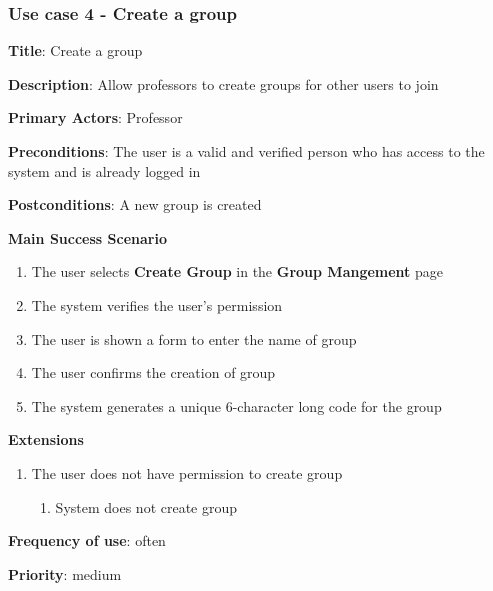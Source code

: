 \documentclass[singlespacing,12pt,parskip,headsepline,consistentlayout]{article}
\begin{document}
\subsubsection{Use case 4 - Create a group}
\begin{flushleft}
\vspace{0.2cm}
\hline
\vspace{0.2cm}
{\bfseries Title}: {Create a group}

{\bfseries Description}: {Allow professors to create groups for other users to join}

{\bfseries Primary Actors}: {Professor}

{\bfseries Preconditions}: The user is a valid and verified person who has access to the system and is already logged in

{\bfseries Postconditions}: {A new group is created}

{\bfseries Main Success Scenario}

\begin{enumerate}
      \item The user selects {\bfseries Create Group} in the {\bfseries Group Mangement} page
      \item The system verifies the user’s permission
      \item The user is shown a form to enter the name of group
      \item The user confirms the creation of group
      \item The system generates a unique 6-character long code for the group
\end{enumerate}
 
{\bfseries Extensions}

\begin{enumerate}
  \item The user does not have permission to create group
  \begin{enumerate}
      \item System does not create group
  \end{enumerate}
\end{enumerate}

{\bfseries Frequency of use}: often

{\bfseries Priority}: medium

\end{flushleft}

\pagebreak
\end{document}

